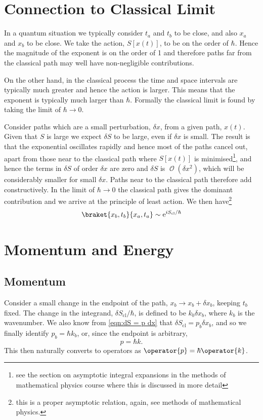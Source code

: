 \documentclass[fleqn]{NotesClass}
\newcommand*{\e}{\mathrm{e}}
\newcommand*{\order}{\mathop{\mathcal{O}}}
\newcommand*{\cl}{\mathrm{cl}}
\begin{document}
    \section{Connection to Classical Limit}
    In a quantum situation we typically consider \(t_a\) and \(t_b\) to be close, and also \(x_a\) and \(x_b\) to be close.
    We take the action, \(S[x(t)]\), to be on the order of \(\hbar\).
    Hence the magnitude of the exponent is on the order of 1 and therefore paths far from the classical path may well have non-negligible contributions.
    
    On the other hand, in the classical process the time and space intervals are typically much greater and hence the action is larger.
    This means that the exponent is typically much larger than \(\hbar\).
    Formally the classical limit is found by taking the limit of \(\hbar \to 0\).
    
    Consider paths which are a small perturbation, \(\delta x\), from a given path, \(x(t)\).
    Given that \(S\) is large we expect \(\delta S\) to be large, even if \(\delta x\) is small.
    The result is that the exponential oscillates rapidly and hence most of the paths cancel out, apart from those near to the classical path where \(S[x(t)]\) is minimised\footnote{see the section on asymptotic integral expansions in the methods of mathematical physics course where this is discussed in more detail}, and hence the terms in \(\delta S\) of order \(\delta x\) are zero and \(\delta S\) is \(\order(\delta x^2)\), which will be considerably smaller for small \(\delta x\).
    Paths near to the classical path therefore add constructively.
    In the limit of \(\hbar \to 0\) the classical path gives the dominant contribution and we arrive at the principle of least action.
    We then have\footnote{this is a proper asymptotic relation, again, see methods of mathematical physics.}
    \begin{equation}
        \braket{x_b, t_b}{x_a, t_a} \sim \e^{i S_{\cl}/\hbar}
    \end{equation}
    
    \section{Momentum and Energy}
    \subsection{Momentum}
    Consider a small change in the endpoint of the path, \(x_b \to x_b + \delta x_b\), keeping \(t_b\) fixed.
    The change in the integrand, \(\delta S_{\cl}/\hbar\), is defined to be \(k_b\delta x_b\), where \(k_b\) is the wavenumber.
    We also know from \cref{eqn:dS = p dx} that \(\delta S_{\cl} = p_b\delta x_b\), and so we finally identify \(p_b = \hbar k_b\), or, since the endpoint is arbitrary,
    \begin{equation}
        p = \hbar k.
    \end{equation}
    This then naturally converts to operators as \(\operator{p} = \hbar \operator{k}\).
    
\end{document}

